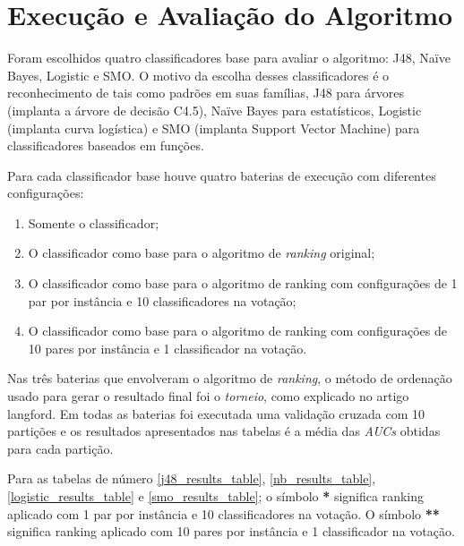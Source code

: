 \section{Execução e Avaliação do Algoritmo}

Foram escolhidos quatro classificadores base para avaliar o algoritmo: J48, Naïve Bayes, Logistic e SMO. O motivo da escolha desses classificadores é o reconhecimento de tais como padrões em suas famílias, J48 para árvores (implanta a árvore de decisão C4.5), Naïve Bayes para estatísticos, Logistic (implanta curva logística) e SMO (implanta Support Vector Machine) para classificadores baseados em funções.

Para cada classificador base houve quatro baterias de execução com diferentes configurações:

\begin{enumerate}

    \item Somente o classificador;
    \item O classificador como base para o algoritmo de \emph{ranking} original;
    \item O classificador como base para o algoritmo de ranking com configurações de 1 par por instância e 10 classificadores na votação;
    \item O classificador como base para o algoritmo de ranking com configurações de 10 pares por instância e 1 classificador na votação.

\end{enumerate}

Nas três baterias que envolveram o algoritmo de \emph{ranking}, o método de ordenação usado para gerar o resultado final foi o \emph{torneio}, como explicado no artigo {{langford}}. Em todas as baterias foi executada uma validação cruzada com 10 partições e os resultados apresentados nas tabelas é a média das \emph{AUCs} obtidas para cada partição.

Para as tabelas de número \ref{j48_results_table}, \ref{nb_results_table}, \ref{logistic_results_table} e \ref{smo_results_table}; o símbolo \textbf{*} significa ranking aplicado com 1 par por instância e 10 classificadores na votação. O símbolo \textbf{**} significa ranking aplicado com 10 pares por instância e 1 classificador na votação.

